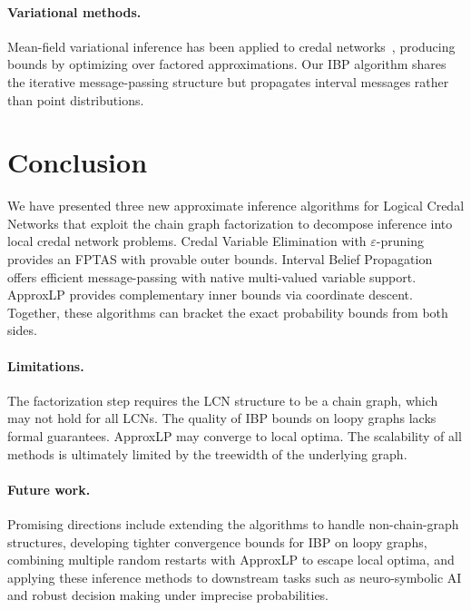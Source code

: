 \documentclass{article}
\begin{document}
\paragraph{Variational methods.} Mean-field variational inference has been applied to credal networks~\cite{jordan1999variational}, producing bounds by optimizing over factored approximations. Our IBP algorithm shares the iterative message-passing structure but propagates interval messages rather than point distributions.


\section{Conclusion}
\label{sec-conclusion}

We have presented three new approximate inference algorithms for Logical Credal Networks that exploit the chain graph factorization to decompose inference into local credal network problems. Credal Variable Elimination with $\varepsilon$-pruning provides an FPTAS with provable outer bounds. Interval Belief Propagation offers efficient message-passing with native multi-valued variable support. ApproxLP provides complementary inner bounds via coordinate descent. Together, these algorithms can bracket the exact probability bounds from both sides.

\paragraph{Limitations.} The factorization step requires the LCN structure to be a chain graph, which may not hold for all LCNs. The quality of IBP bounds on loopy graphs lacks formal guarantees. ApproxLP may converge to local optima. The scalability of all methods is ultimately limited by the treewidth of the underlying graph.

\paragraph{Future work.} Promising directions include extending the algorithms to handle non-chain-graph structures, developing tighter convergence bounds for IBP on loopy graphs, combining multiple random restarts with ApproxLP to escape local optima, and applying these inference methods to downstream tasks such as neuro-symbolic AI and robust decision making under imprecise probabilities.
\end{document}
